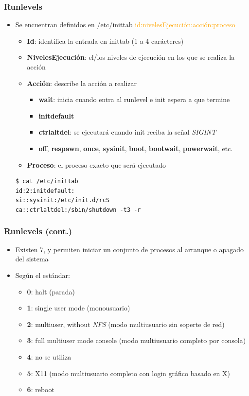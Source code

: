 \begin{frame}[fragile]
  \frametitle{Runlevels}
  \begin{itemize}
	  	\item Se encuentran definidos en /etc/inittab
	  	\textcolor{orange}{id:nivelesEjecución:acción:proceso}
		\begin{itemize}
			\item \textbf{Id}: identifica la entrada en inittab (1 a 4 carácteres)
			\item \textbf{NivelesEjecución}: el/los niveles de ejecución en los que se realiza la acción
			\item \textbf{Acción}: describe la acción a realizar
			\begin{itemize}
				\item \textbf{wait}: inicia cuando entra al runlevel e init espera a que termine
				\item \textbf{initdefault}
				\item \textbf{ctrlaltdel}: se ejecutará cuando init reciba la señal \emph{SIGINT}
				\item \textbf{off}, \textbf{respawn}, \textbf{once}, \textbf{sysinit}, \textbf{boot}, \textbf{bootwait}, \textbf{powerwait}, etc.
			\end{itemize}
			\item \textbf{Proceso}: el proceso exacto que será ejecutado
		\end{itemize}
		\begin{lstlisting}
$ cat /etc/inittab
id:2:initdefault:
si::sysinit:/etc/init.d/rcS
ca::ctrlaltdel:/sbin/shutdown -t3 -r
		\end{lstlisting}
  \end{itemize}
\end{frame}

\begin{frame}
  \frametitle{Runlevels (cont.)}
  \begin{itemize}
	  	\item Existen 7, y permiten iniciar un conjunto de procesos al arranque o apagado del sistema
	  	\item Según el estándar:
	  	\begin{itemize}
	  		\item \textbf{0}: halt (parada)
	  		\item \textbf{1}: single user mode (monousuario)
	  		\item \textbf{2}: multiuser, without \textit{NFS} (modo multiusuario sin soperte de red)
	  		\item \textbf{3}: full multiuser mode console (modo multiusuario completo por consola)
	  		\item \textbf{4}: no se utiliza
	  		\item \textbf{5}: X11 (modo multiusuario completo con login gráfico basado en X)
	  		\item \textbf{6}: reboot
	  	\end{itemize}	  	
  \end{itemize}
\end{frame}

